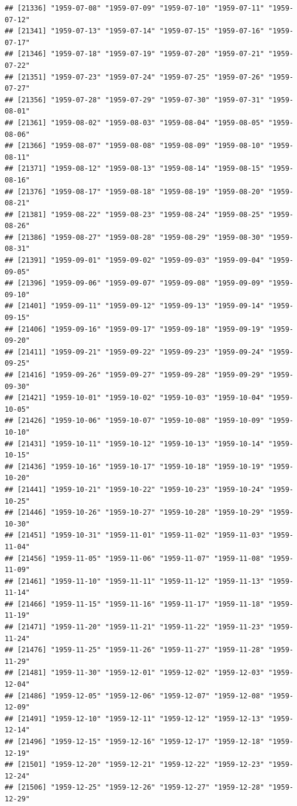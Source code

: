 \documentclass{article}\usepackage[]{graphicx}\usepackage[]{color}
\makeatletter
\newenvironment{kframe}{%
 \def\at@end@of@kframe{}%
 \ifinner\ifhmode%
  \def\at@end@of@kframe{\end{minipage}}%
  \begin{minipage}{\columnwidth}%
 \fi\fi%
 \def\FrameCommand##1{\hskip\@totalleftmargin \hskip-\fboxsep
 \colorbox{shadecolor}{##1}\hskip-\fboxsep
     \hskip-\linewidth \hskip-\@totalleftmargin \hskip\columnwidth}%
 \MakeFramed {\advance\hsize-\width
   \@totalleftmargin\z@ \linewidth\hsize
   \@setminipage}}%
 {\par\unskip\endMakeFramed%
 \at@end@of@kframe}
\newenvironment{knitrout}{}{} %
\makeatother
\begin{document}
\begin{description}
\begin{knitrout}
\begin{kframe}
\begin{verbatim}
## [21336] "1959-07-08" "1959-07-09" "1959-07-10" "1959-07-11" "1959-07-12"
## [21341] "1959-07-13" "1959-07-14" "1959-07-15" "1959-07-16" "1959-07-17"
## [21346] "1959-07-18" "1959-07-19" "1959-07-20" "1959-07-21" "1959-07-22"
## [21351] "1959-07-23" "1959-07-24" "1959-07-25" "1959-07-26" "1959-07-27"
## [21356] "1959-07-28" "1959-07-29" "1959-07-30" "1959-07-31" "1959-08-01"
## [21361] "1959-08-02" "1959-08-03" "1959-08-04" "1959-08-05" "1959-08-06"
## [21366] "1959-08-07" "1959-08-08" "1959-08-09" "1959-08-10" "1959-08-11"
## [21371] "1959-08-12" "1959-08-13" "1959-08-14" "1959-08-15" "1959-08-16"
## [21376] "1959-08-17" "1959-08-18" "1959-08-19" "1959-08-20" "1959-08-21"
## [21381] "1959-08-22" "1959-08-23" "1959-08-24" "1959-08-25" "1959-08-26"
## [21386] "1959-08-27" "1959-08-28" "1959-08-29" "1959-08-30" "1959-08-31"
## [21391] "1959-09-01" "1959-09-02" "1959-09-03" "1959-09-04" "1959-09-05"
## [21396] "1959-09-06" "1959-09-07" "1959-09-08" "1959-09-09" "1959-09-10"
## [21401] "1959-09-11" "1959-09-12" "1959-09-13" "1959-09-14" "1959-09-15"
## [21406] "1959-09-16" "1959-09-17" "1959-09-18" "1959-09-19" "1959-09-20"
## [21411] "1959-09-21" "1959-09-22" "1959-09-23" "1959-09-24" "1959-09-25"
## [21416] "1959-09-26" "1959-09-27" "1959-09-28" "1959-09-29" "1959-09-30"
## [21421] "1959-10-01" "1959-10-02" "1959-10-03" "1959-10-04" "1959-10-05"
## [21426] "1959-10-06" "1959-10-07" "1959-10-08" "1959-10-09" "1959-10-10"
## [21431] "1959-10-11" "1959-10-12" "1959-10-13" "1959-10-14" "1959-10-15"
## [21436] "1959-10-16" "1959-10-17" "1959-10-18" "1959-10-19" "1959-10-20"
## [21441] "1959-10-21" "1959-10-22" "1959-10-23" "1959-10-24" "1959-10-25"
## [21446] "1959-10-26" "1959-10-27" "1959-10-28" "1959-10-29" "1959-10-30"
## [21451] "1959-10-31" "1959-11-01" "1959-11-02" "1959-11-03" "1959-11-04"
## [21456] "1959-11-05" "1959-11-06" "1959-11-07" "1959-11-08" "1959-11-09"
## [21461] "1959-11-10" "1959-11-11" "1959-11-12" "1959-11-13" "1959-11-14"
## [21466] "1959-11-15" "1959-11-16" "1959-11-17" "1959-11-18" "1959-11-19"
## [21471] "1959-11-20" "1959-11-21" "1959-11-22" "1959-11-23" "1959-11-24"
## [21476] "1959-11-25" "1959-11-26" "1959-11-27" "1959-11-28" "1959-11-29"
## [21481] "1959-11-30" "1959-12-01" "1959-12-02" "1959-12-03" "1959-12-04"
## [21486] "1959-12-05" "1959-12-06" "1959-12-07" "1959-12-08" "1959-12-09"
## [21491] "1959-12-10" "1959-12-11" "1959-12-12" "1959-12-13" "1959-12-14"
## [21496] "1959-12-15" "1959-12-16" "1959-12-17" "1959-12-18" "1959-12-19"
## [21501] "1959-12-20" "1959-12-21" "1959-12-22" "1959-12-23" "1959-12-24"
## [21506] "1959-12-25" "1959-12-26" "1959-12-27" "1959-12-28" "1959-12-29"

\end{verbatim}
\end{kframe}
\end{knitrout}
\end{description}
\end{document}
